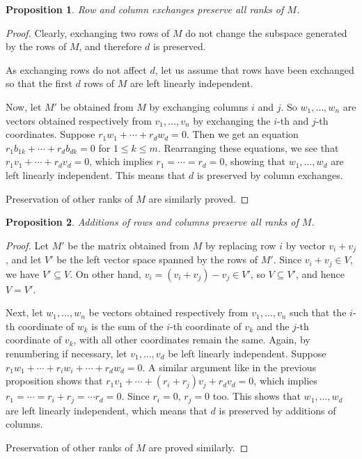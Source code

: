 \documentclass[12pt]{article}
\newtheorem{prop}{Proposition}
\begin{document}
\begin{prop}  Row and column exchanges preserve all ranks of $M$.  \end{prop}
\begin{proof}  Clearly, exchanging two rows of $M$ do not change the subspace generated by the rows of $M$, and therefore $d$ is preserved.  

As exchanging rows do not affect $d$, let us assume that rows have been exchanged so that the first $d$ rows of $M$ are left linearly independent.

Now, let $M'$ be obtained from $M$ by exchanging columns $i$ and $j$.  So $w_1,\ldots, w_n$ are vectors obtained respectively from $v_1,\ldots, v_n$ by exchanging the $i$-th and $j$-th coordinates.  Suppose $r_1w_1+\cdots + r_dw_d=0$.  Then we get an equation $r_1b_{1k}+\cdots + r_d b_{dk}=0$ for $1\le k\le m$.  Rearranging these equations, we see that $r_1v_1 + \cdots + r_dv_d=0$, which implies $r_1=\cdots = r_d =0$, showing that $w_1,\ldots, w_d$  are left linearly independent.  This means that $d$ is preserved by column exchanges.

Preservation of other ranks of $M$ are similarly proved.
\end{proof}

\begin{prop} Additions of rows and columns preserve all ranks of $M$. \end{prop}
\begin{proof}  Let $M'$ be the matrix obtained from $M$ by replacing row $i$ by vector $v_i+v_j$, and let $V'$ be the left vector space spanned by the rows of $M'$.  Since $v_i+v_j\in V$, we have $V'\subseteq V$.  On other hand, $v_i=(v_i+v_j)-v_j \in V'$, so $V\subseteq V'$, and hence $V=V'$.

Next, let $w_1,\ldots, w_n$ be vectors obtained respectively from $v_1,\ldots, v_n$ such that the $i$-th coordinate of $w_k$ is the sum of the $i$-th coordinate of $v_k$ and the $j$-th coordinate of $v_k$, with all other coordinates remain the same.  Again, by renumbering if necessary, let $v_1,\ldots, v_d$ be left linearly independent.  Suppose $r_1w_1 + \cdots + r_iw_i+ \cdots + r_dw_d = 0$.  A similar argument like in the previous proposition shows that $r_1v_1+\cdots + (r_i+r_j)v_j + r_dv_d = 0$, which implies $r_1 =\cdots = r_i+r_j = \cdots r_d = 0$.  Since $r_i=0$, $r_j=0$ too.  This shows that $w_1,\ldots, w_d$ are left linearly independent, which means that $d$ is preserved by additions of columns.

Preservation of other ranks of $M$ are proved similarly.
\end{proof}
\end{document}
